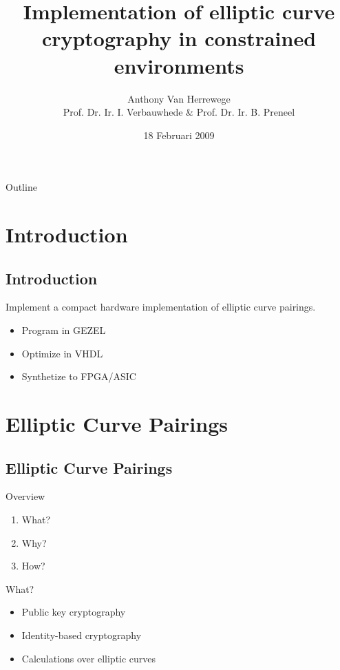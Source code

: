 \documentclass{beamer}
\title{Implementation of elliptic curve cryptography in constrained environments}
\author[Anthony Van Herrewege]{Anthony Van Herrewege\\Prof. Dr. Ir. I. 	Verbauwhede \& Prof. Dr. Ir. B. Preneel}
\date{18 Februari 2009}
\begin{document}
\frame{\titlepage}

\section[Outline]{}
\begin{frame}{Outline}
  \tableofcontents
\end{frame}

\section{Introduction}
\subsection*{Introduction}
\begin{frame}
	\begin{center}
		Implement a \alert{compact} \alert{hardware} implementation of \alert{elliptic curve pairings}.
		
		\begin{itemize}
			\item<2-> Program in GEZEL
			\item<2-> Optimize in VHDL
			\item<2-> Synthetize to FPGA/ASIC
		\end{itemize}
	\end{center}
\end{frame}

\section{Elliptic Curve Pairings}
\subsection*{Elliptic Curve Pairings}
\begin{frame}{Overview}
	\begin{enumerate}
		\item<1-> What?
		\item<1-> Why?
		\item<1-> How?
	\end{enumerate}
\end{frame}

\begin{frame}{What?}
  \begin{itemize}
    \item<1-> Public key cryptography
    \item<2-> \alert{Identity}-based cryptography
    \item<3-> Calculations over elliptic curves
  \end{itemize}
\end{frame}
\end{document}
